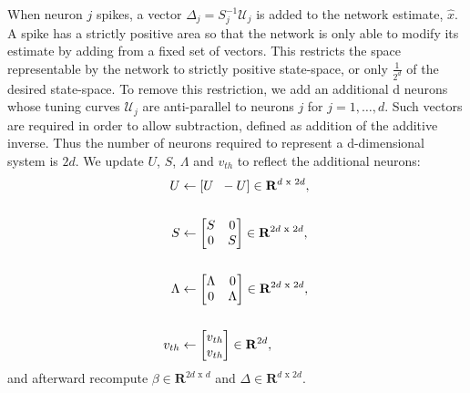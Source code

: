 \begin{enumerate}
When neuron $j$ spikes, a vector $\Delta_j = S^{-1}_j \mathcal{U}_j$ is added to the network estimate, $\hat{x}$. A spike has a strictly positive area so that the network is only able to modify its estimate by adding from a fixed set of vectors.  This restricts the space representable by the network to strictly positive state-space, or only $\frac{1}{2^d}$ of the desired state-space. To remove this restriction, we add an additional d neurons whose tuning curves $\mathcal{U}_j$ are anti-parallel to neurons $j$ for $j=1, \ldots, d$. Such vectors are required in order to allow subtraction, defined as addition of the additive inverse. Thus the number of neurons required to represent a d-dimensional system is $2d$. We update $U$, $S$, $\Lambda$ and $v_{th}$ to reflect the additional neurons:
\begin{align*}
    U &\leftarrow \left[ U \hspace{2mm} -U\right] \in \mathbf{R}^{d \text{ x } 2 d},\\
    \\
    S &\leftarrow
    \begin{bmatrix}
    S & 0 \\ 0 & S
    \end{bmatrix}
    \in \mathbf{R}^{2 d \text{ x } 2 d},\\
    \\
    \Lambda &\leftarrow
    \begin{bmatrix}
    \Lambda & 0 \\ 0 & \Lambda
    \end{bmatrix}
    \in \mathbf{R}^{2 d \text{ x } 2 d},\\
    \\
    v_{th} &\leftarrow 
    \begin{bmatrix}
    v_{th} \\ v_{th}
    \end{bmatrix} \in \mathbf{R}^{2d},
\end{align*}
and afterward recompute $\beta \in \mathbf{R}^{2 d \text{ x } d}$ and $\Delta \in \mathbf{R}^{d \text{ x } 2 d}$. 

\end{enumerate}

